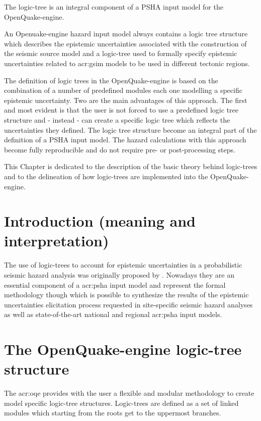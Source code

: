 %
The logic-tree is an integral component of a PSHA input model for the 
OpenQuake-engine.  

An Openuake-engine hazard input model always contains a logic tree structure 
which describes the epistemic uncertainties associated with the construction 
of the seismic source model and a logic-tree used to formally specify 
epistemic uncertainties related to \gls{acr:gsim} models to be used in 
different tectonic regions.

The definition of logic trees in the OpenQuake-engine is based on
the combination of a number of predefined modules each one modelling a specific
epistemic uncertainty. Two are the main advantages of this approach. The first
and most evident is that the user is not forced to use a predefined logic tree
structure and - instead - can create a specific logic tree which reflects the 
uncertainties they defined. The logic tree structure become an integral part of
the definition of a PSHA input model. The hazard calculations with this approach
become fully reproducible and do not require pre- or post-processing steps.

This Chapter is dedicated to the description of the basic theory behind 
logic-trees and to the delineation of how logic-trees are implemented 
into the OpenQuake-engine.
%
\section{Introduction (meaning and interpretation)}
The use of logic-trees to account for epistemic uncertainties in a 
probabilistic seismic hazard analysis was originally proposed by 
\textcite{kulkarni84}.
%
Nowadays they are an essential component of a \gls{acr:psha} input
model and represent the formal methodology though which is possible to 
synthesize the results of the epistemic uncertainties elicitation process
requested in site-specific seismic hazard analyses \parencite{budnitz1997}
as well as state\--of\--the\--art national and regional \gls{acr:psha} 
input models. 
%
\section{The OpenQuake-engine logic-tree structure}
%
The \gls{acr:oqe} provides with the user a flexible and modular methodology 
to create model specific logic-tree structures. Logic-trees are defined as a
set of linked modules which starting from the roots get to the uppermost 
branches.
%
